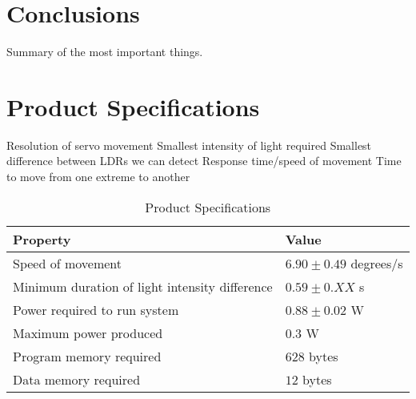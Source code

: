\documentclass[journal]{Imperial_lab_report}
\begin{document}
\section{Conclusions}
Summary of the most important things. 

\section{Product Specifications}
Resolution of servo movement
Smallest intensity of light required
Smallest difference between LDRs we can detect
Response time/speed of movement
Time to move from one extreme to another

\begin{table}[!t]
\renewcommand{\arraystretch}{1.3}
\caption{Product Specifications}
\label{table_example}
\centering
\begin{tabular}{|l||l|}
\hline
\textbf{Property} &\textbf{Value}\\
\hline \hline
Speed of movement & $6.90 \pm 0.49$ degrees/s\\
\hline
Minimum duration of light intensity difference & $0.59 \pm 0.XX$ s\\
\hline
Power required to run system & $0.88 \pm 0.02 $ W \\
\hline
Maximum power produced & $0.3$ W\\ %
\hline 
Program memory required & $628$ bytes \\
\hline
Data memory required & $12$ bytes\\
\hline
\end{tabular}
\end{table}


%
%
\end{document}
